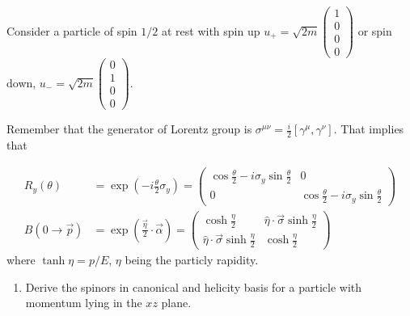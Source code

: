 


Consider a particle of spin $1/2$ at rest with spin up $u_{+} = \sqrt{2m}\begin{pmatrix} 1 \\ 0 \\ 0 \\ 0\end{pmatrix}$ or spin down, $u_{-} = \sqrt{2m}\begin{pmatrix} 0 \\ 1 \\ 0 \\ 0\end{pmatrix}$.

Remember that the generator of Lorentz group is $\sigma^{\mu\nu} = \frac{i}{2}\left[\gamma^\mu,\gamma^\nu\right]$. That implies that

\begin{align}
    R_y(\theta)     & = \exp\left(-i\frac{\theta}{2} \sigma_y\right) = \begin{pmatrix} \cos \frac{\theta}{2} - i \sigma_y \sin \frac{\theta}{2} & 0                                                        \\
                0                                                        & \cos \frac{\theta}{2} - i \sigma_y \sin \frac{\theta}{2}
                                                                       \end{pmatrix} \\
    B(0 \to \vec p) & = \exp\left(\frac{\vec\eta}{2} \cdot \vec \alpha \right) = \begin{pmatrix} \cosh \frac{\eta}{2}                             & \hat \eta \cdot \vec \sigma \sinh \frac{\eta}{2} \\
                \hat \eta \cdot \vec \sigma \sinh \frac{\eta}{2} & \cosh \frac{\eta}{2}
                                                                                 \end{pmatrix}
\end{align}
where $\tanh\eta = p/E$, $\eta$ being the particly rapidity.


\begin{enumerate}
    \item Derive the spinors in canonical and helicity basis for a particle with momentum lying in the $xz$ plane.
\end{enumerate}

